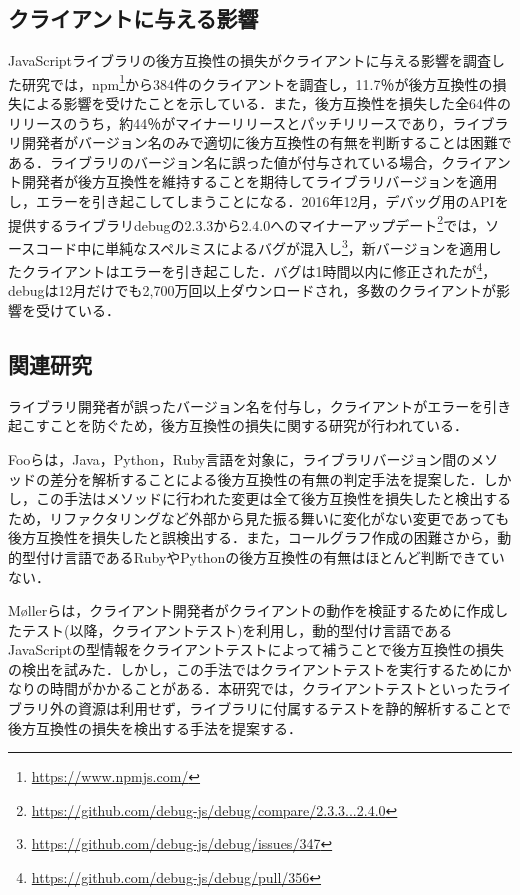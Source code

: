 \documentclass[submit]{ipsj}
\begin{document}
\subsection{クライアントに与える影響}
JavaScriptライブラリの後方互換性の損失がクライアントに与える影響を調査した研究\cite{impact-analysis-for-clients}では，npm\footnote{\url{https://www.npmjs.com/}}から384件のクライアントを調査し，11.7％が後方互換性の損失による影響を受けたことを示している．また，後方互換性を損失した全64件のリリースのうち，約44％がマイナーリリースとパッチリリースであり，ライブラリ開発者がバージョン名のみで適切に後方互換性の有無を判断することは困難である．ライブラリのバージョン名に誤った値が付与されている場合，クライアント開発者が後方互換性を維持することを期待してライブラリバージョンを適用し，エラーを引き起こしてしまうことになる．2016年12月，デバッグ用のAPIを提供するライブラリdebugの2.3.3から2.4.0へのマイナーアップデート\footnote{\url{https://github.com/debug-js/debug/compare/2.3.3...2.4.0}}では，ソースコード中に単純なスペルミスによるバグが混入し\footnote{\url{https://github.com/debug-js/debug/issues/347}}，新バージョンを適用したクライアントはエラーを引き起こした．バグは1時間以内に修正されたが\footnote{\url{https://github.com/debug-js/debug/pull/356}}，debugは12月だけでも2,700万回以上ダウンロードされ，多数のクライアントが影響を受けている．

\subsection{関連研究}
ライブラリ開発者が誤ったバージョン名を付与し，クライアントがエラーを引き起こすことを防ぐため，後方互換性の損失に関する研究が行われている\cite{How_Do_Api_Evolve}\cite{A_Study_on_Behavioral}\cite{How_to_Break_an_API}．

Fooらは，Java，Python，Ruby言語を対象に，ライブラリバージョン間のメソッドの差分を解析することによる後方互換性の有無の判定手法を提案した\cite{foo}．しかし，この手法はメソッドに行われた変更は全て後方互換性を損失したと検出するため，リファクタリングなど外部から見た振る舞いに変化がない変更であっても後方互換性を損失したと誤検出する．また，コールグラフ作成の困難さから，動的型付け言語であるRubyやPythonの後方互換性の有無はほとんど判断できていない．

Møllerらは，クライアント開発者がクライアントの動作を検証するために作成したテスト(以降，クライアントテスト)を利用し，動的型付け言語であるJavaScriptの型情報をクライアントテストによって補うことで後方互換性の損失の検出を試みた\cite{type-regression-testing}\cite{model-based-testing}．しかし，この手法ではクライアントテストを実行するためにかなりの時間がかかることがある．本研究では，クライアントテストといったライブラリ外の資源は利用せず，ライブラリに付属するテストを静的解析することで後方互換性の損失を検出する手法を提案する．
\end{document}
